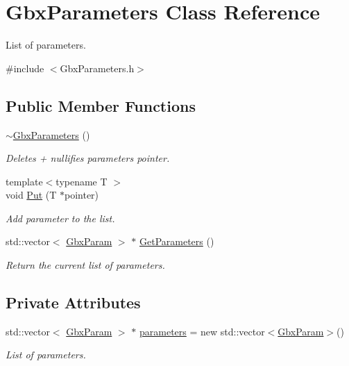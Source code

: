 \hypertarget{classGbxParameters}{\section{Gbx\-Parameters Class Reference}
\label{classGbxParameters}
}


List of parameters.  




{\ttfamily \#include $<$Gbx\-Parameters.\-h$>$}

\subsection*{Public Member Functions}
\begin{DoxyCompactItemize}
\item 
\hyperlink{classGbxParameters_afac5dd05e28a0e7014483317fc83fdf5}{$\sim$\-Gbx\-Parameters} ()
\begin{DoxyCompactList}\small\item\em Deletes + nullifies parameters pointer. \end{DoxyCompactList}\item 
{\footnotesize template$<$typename T $>$ }\\void \hyperlink{classGbxParameters_a2cf83794717cf9fdc13e5ff12e259f04}{Put} (T $\ast$pointer)
\begin{DoxyCompactList}\small\item\em Add parameter to the list. \end{DoxyCompactList}\item 
std\-::vector$<$ \hyperlink{structGbxParam}{Gbx\-Param} $>$ $\ast$ \hyperlink{classGbxParameters_ac980093c86726dd0c71ba46b88885ca1}{Get\-Parameters} ()
\begin{DoxyCompactList}\small\item\em Return the current list of parameters. \end{DoxyCompactList}\end{DoxyCompactItemize}
\subsection*{Private Attributes}
\begin{DoxyCompactItemize}
\item 
std\-::vector$<$ \hyperlink{structGbxParam}{Gbx\-Param} $>$ $\ast$ \hyperlink{classGbxParameters_af2c27b8d1e5c3884d0e5cc9ba04953cf}{parameters} = new std\-::vector$<$\hyperlink{structGbxParam}{Gbx\-Param}$>$()
\begin{DoxyCompactList}\small\item\em List of parameters. \end{DoxyCompactList}\end{DoxyCompactItemize}


